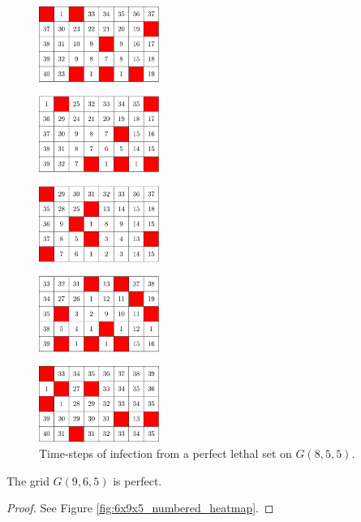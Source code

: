 \begin{figure}[H]
\centering
\includegraphics[width=0.35\textwidth]{figures/7/5x8x5_numbered_heatmap.pdf}
\caption{Time-steps of infection from a perfect lethal set on $G(8,5,5)$.}
\label{fig:5x8x5_numbered_heatmap}
\end{figure}

\newpage

\begin{con}
\label{con:9x6x5}
The grid $G(9,6,5)$ is perfect.
\end{con}

\begin{proof}
See Figure \ref{fig:6x9x5_numbered_heatmap}.
\end{proof}

